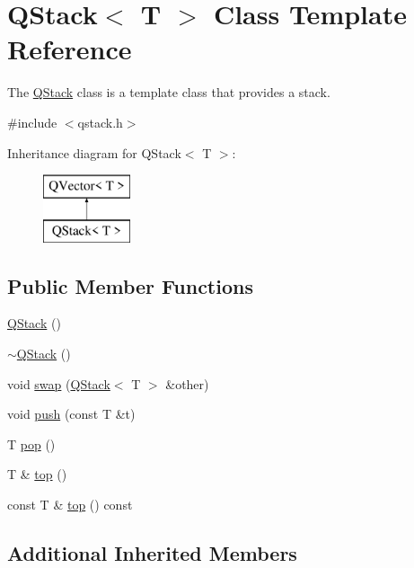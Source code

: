 \hypertarget{class_q_stack}{}\section{Q\+Stack$<$ T $>$ Class Template Reference}
\label{class_q_stack}


The \hyperlink{class_q_stack}{Q\+Stack} class is a template class that provides a stack.  




{\ttfamily \#include $<$qstack.\+h$>$}

Inheritance diagram for Q\+Stack$<$ T $>$\+:\begin{figure}[H]
\begin{center}
\leavevmode
\includegraphics[height=2.000000cm]{class_q_stack}
\end{center}
\end{figure}
\subsection*{Public Member Functions}
\begin{DoxyCompactItemize}
\item 
\hyperlink{class_q_stack_ab42514d12612ebaf86f9db5068eaf390}{Q\+Stack} ()
\item 
\hyperlink{class_q_stack_ab0a0458193135b516c7a083ac8a3d4a2}{$\sim$\+Q\+Stack} ()
\item 
void \hyperlink{class_q_stack_afc2b34603e880f6ccf533835a407d601}{swap} (\hyperlink{class_q_stack}{Q\+Stack}$<$ T $>$ \&other)
\item 
void \hyperlink{class_q_stack_afe6cdb317571080fa991ba998db2801e}{push} (const T \&t)
\item 
T \hyperlink{class_q_stack_ad2944420ebf35829a8f7c54d75ea8a35}{pop} ()
\item 
T \& \hyperlink{class_q_stack_a3253bfc5509f9c4afffe60b10326961d}{top} ()
\item 
const T \& \hyperlink{class_q_stack_ad5942029d173afac32132085f7f140db}{top} () const 
\end{DoxyCompactItemize}
\subsection*{Additional Inherited Members}



